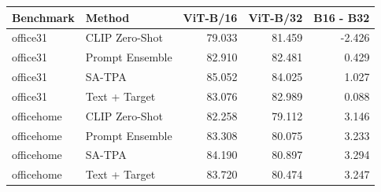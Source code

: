 \begin{tabular}{llrrr}
\toprule
Benchmark & Method & ViT-B/16 & ViT-B/32 & B16 - B32 \\
\midrule
office31 & CLIP Zero-Shot & 79.033 & 81.459 & -2.426 \\
office31 & Prompt Ensemble & 82.910 & 82.481 & 0.429 \\
office31 & SA-TPA & 85.052 & 84.025 & 1.027 \\
office31 & Text + Target & 83.076 & 82.989 & 0.088 \\
officehome & CLIP Zero-Shot & 82.258 & 79.112 & 3.146 \\
officehome & Prompt Ensemble & 83.308 & 80.075 & 3.233 \\
officehome & SA-TPA & 84.190 & 80.897 & 3.294 \\
officehome & Text + Target & 83.720 & 80.474 & 3.247 \\
\bottomrule
\end{tabular}
